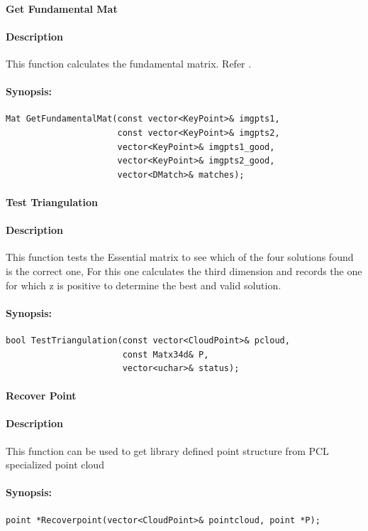 \paragraph{Get Fundamental Mat}
\paragraph{Description}
This function calculates the fundamental matrix. Refer \cite{hartley2003multiple, hartley1995linear}. 
\paragraph{Synopsis:}
\begin{lstlisting}
Mat GetFundamentalMat(const vector<KeyPoint>& imgpts1, 
					  const vector<KeyPoint>& imgpts2, 
					  vector<KeyPoint>& imgpts1_good, 
					  vector<KeyPoint>& imgpts2_good, 
					  vector<DMatch>& matches);
\end{lstlisting}

\paragraph{ Test Triangulation }
\paragraph{Description}
This function tests the Essential matrix to see which of the four solutions found is the correct one, For this one calculates the third dimension and records the one for which z is positive to determine the best and valid solution.
\paragraph{Synopsis:}
\begin{lstlisting}
bool TestTriangulation(const vector<CloudPoint>& pcloud, 
					   const Matx34d& P, 
					   vector<uchar>& status);
\end{lstlisting}


\paragraph{ Recover Point }
\paragraph{Description}
 This function can be used to get library defined point structure from PCL specialized point cloud 
\paragraph{Synopsis:}
\begin{lstlisting}
point *Recoverpoint(vector<CloudPoint>& pointcloud, point *P);
\end{lstlisting}

